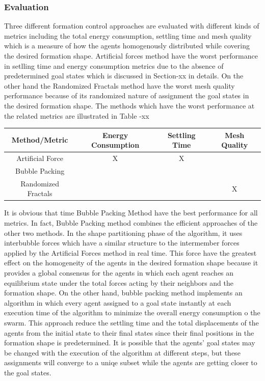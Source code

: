 \documentclass[twoside]{article}
\begin{document}
		 
		
			 \subsubsection{Evaluation} 
		Three different formation control approaches are evaluated with different kinds of metrics including the total energy consumption, settling time and mesh quality which is a measure of how the agents homogenously distributed while covering the desired formation shape. Artificial forces method have the worst performance in setlling time and energy consumption metrics due to the absence of predetermined goal states which is discussed in Section-xx in details. On the other hand the Randomized Fractals method have the worst mesh quality performance because of its randomized nature of assignment the goal states in the desired formation shape. The methods which have the worst performance at the related metrics are illustrated in Table -xx
		
		
		\begin{center}
			 \label{tab:title} 
			\begin{tabular}{||c| c| c |c ||}
				
				\hline
				\textbf{Method/Metric} & \textbf{Energy Consumption}  & \textbf{Settling Time} & \textbf{Mesh Quality}\\ 
				\hline
				Artificial Force & X & X &  \\
				Bubble Packing & &  &  \\	
				Randomized Fractals & &  & X \\	
				\hline
			\end{tabular}
		\end{center}
		
		It is obvious that time Bubble Packing Method have the best performance for all metrics. In fact, Bubble Packing method combines the efficient approaches of the other two methods. In the shape partitioning phase of the algorithm, it uses interbubble forces which have a similar structure to the intermember forces applied by the Artificial Forces method in real time. This force have the greatest  effect on the homogeneity of the agents in the desired formation shape because it provides a global consensus for the agents in which each agent reaches an equilibrium state under the total forces acting by their neighbors and the formation shape. On the other hand, bubble packing method implements an algorithm in which every agent assigned to a goal state instantly at each execution time of the algorithm to minimize the overall energy consumption o the swarm. This approach reduce the settling time and the total displacements of the agents from the initial state to their final states since their final positions in the formation shape is predetermined. It is possible that the agents' goal states may be changed with the execution of the algorithm at different steps, but these assignments will converge to a uniqe subset while the agents are getting closer to the goal states. 
		
\end{document}
